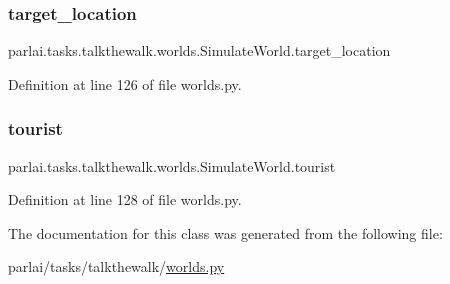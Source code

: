 \subsubsection{\texorpdfstring{target\+\_\+location}{target\_location}}
{\footnotesize\ttfamily parlai.\+tasks.\+talkthewalk.\+worlds.\+Simulate\+World.\+target\+\_\+location\hspace{0.3cm}{\ttfamily [static]}}



Definition at line 126 of file worlds.\+py.

\mbox{\label{classparlai_1_1tasks_1_1talkthewalk_1_1worlds_1_1SimulateWorld_abfa37e958248323fcffa9455487dca0c}} 
\subsubsection{\texorpdfstring{tourist}{tourist}}
{\footnotesize\ttfamily parlai.\+tasks.\+talkthewalk.\+worlds.\+Simulate\+World.\+tourist\hspace{0.3cm}{\ttfamily [static]}}



Definition at line 128 of file worlds.\+py.



The documentation for this class was generated from the following file\+:\begin{DoxyCompactItemize}
\item 
parlai/tasks/talkthewalk/\hyperlink{parlai_2tasks_2talkthewalk_2worlds_8py}{worlds.\+py}\end{DoxyCompactItemize}
